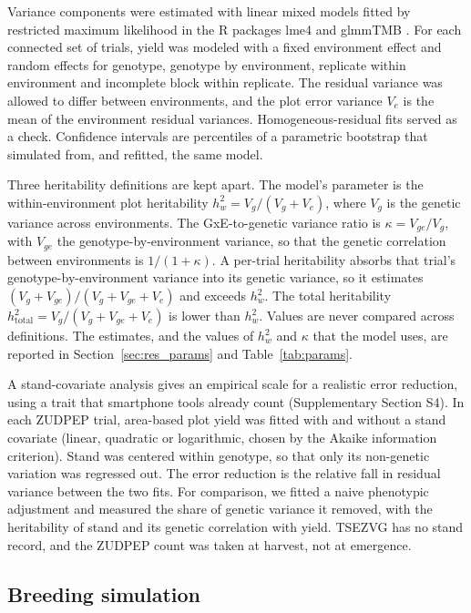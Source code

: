 Variance components were estimated with linear mixed models fitted by restricted maximum likelihood in the R packages lme4 and glmmTMB \citep{Bates2015Fitting,Brooks2017glmmTMB}. For each connected set of trials, yield was modeled with a fixed environment effect and random effects for genotype, genotype by environment, replicate within environment and incomplete block within replicate. The residual variance was allowed to differ between environments, and the plot error variance $V_e$ is the mean of the environment residual variances. Homogeneous-residual fits served as a check. Confidence intervals are percentiles of a parametric bootstrap that simulated from, and refitted, the same model.

Three heritability definitions are kept apart. The model's parameter is the within-environment plot heritability $h^2_w = V_g/(V_g+V_e)$, where $V_g$ is the genetic variance across environments. The GxE-to-genetic variance ratio is $\kappa = V_{ge}/V_g$, with $V_{ge}$ the genotype-by-environment variance, so that the genetic correlation between environments is $1/(1+\kappa)$. A per-trial heritability absorbs that trial's genotype-by-environment variance into its genetic variance, so it estimates $(V_g+V_{ge})/(V_g+V_{ge}+V_e)$ and exceeds $h^2_w$. The total heritability $h^2_{\mathrm{total}} = V_g/(V_g+V_{ge}+V_e)$ is lower than $h^2_w$. Values are never compared across definitions. The estimates, and the values of $h^2_w$ and $\kappa$ that the model uses, are reported in Section~\ref{sec:res_params} and Table~\ref{tab:params}.

A stand-covariate analysis gives an empirical scale for a realistic error reduction, using a trait that smartphone tools already count (Supplementary Section S4). In each ZUDPEP trial, area-based plot yield was fitted with and without a stand covariate (linear, quadratic or logarithmic, chosen by the Akaike information criterion). Stand was centered within genotype, so that only its non-genetic variation was regressed out. The error reduction is the relative fall in residual variance between the two fits. For comparison, we fitted a naive phenotypic adjustment and measured the share of genetic variance it removed, with the heritability of stand and its genetic correlation with yield. TSEZVG has no stand record, and the ZUDPEP count was taken at harvest, not at emergence.

\subsection{Breeding simulation}
\label{sec:layer1}

